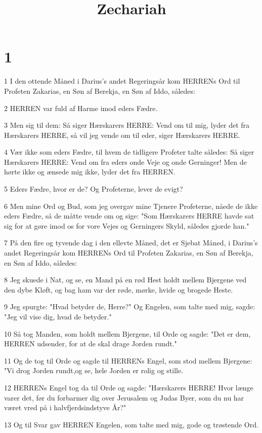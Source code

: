 

\title{Zechariah}


\chapter{1}

\par 1 I den ottende Måned i Darius's andet Regeringsår kom HERRENs Ord til Profeten Zakarias, en Søn af Berekja, en Søn af Iddo, således:
\par 2 HERREN var fuld af Harme imod eders Fædre.
\par 3 Men sig til dem: Så siger Hærskarers HERRE: Vend om til mig, lyder det fra Hærskarers HERRE, så vil jeg vende om til eder, siger Hærskarers HERRE.
\par 4 Vær ikke som eders Fædre, til hvem de tidligere Profeter talte således: Så siger Hærskarers HERRE: Vend om fra eders onde Veje og onde Gerninger! Men de hørte ikke og ænsede mig ikke, lyder det fra HERREN.
\par 5 Eders Fædre, hvor er de? Og Profeterne, lever de evigt?
\par 6 Men mine Ord og Bud, som jeg overgav mine Tjenere Profeterne, nåede de ikke eders Fædre, så de måtte vende om og sige: "Som Hærskarers HERRE havde sat sig for at gøre imod os for vore Vejes og Gerningers Skyld, således gjorde han."
\par 7 På den fire og tyvende dag i den ellevte Måned, det er Sjebat Måned, i Darius's andet Regeringsår kom HERRENs Ord til Profeten Zakarias, en Søn af Berekja, en Søn af Iddo, således:
\par 8 Jeg skuede i Nat, og se, en Mand på en rød Hest holdt mellem Bjergene ved den dybe Kløft, og bag ham var der røde, mørke, hvide og brogede Heste.
\par 9 Jeg spurgte: "Hvad betyder de, Herre?" Og Engelen, som talte med mig, sagde: "Jeg vil vise dig, hvad de betyder."
\par 10 Så tog Manden, som holdt mellem Bjergene, til Orde og sagde: "Det er dem, HERREN udsender, for at de skal drage Jorden rundt."
\par 11 Og de tog til Orde og sagde til HERRENs Engel, som stod mellem Bjergene: "Vi drog Jorden rundt,og se, hele Jorden er rolig og stille.
\par 12 HERRENs Engel tog da til Orde og sagde: "Hærskarers HERRE! Hvor længe varer det, før du forbarmer dig over Jerusalem og Judas Byer, som du nu har været vred på i halvfjerdsindstyve År?"
\par 13 Og til Svar gav HERREN Engelen, som talte med mig, gode og trøstende Ord.
